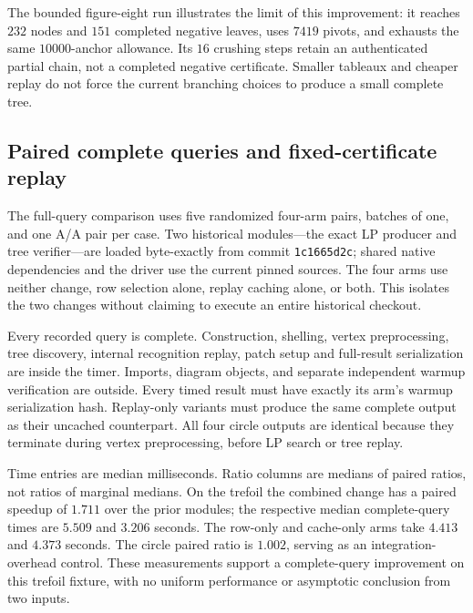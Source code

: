 The bounded figure-eight run illustrates the limit of this improvement:
it reaches $232$ nodes and $151$ completed negative leaves, uses $7419$
pivots, and exhausts the same $10000$-anchor allowance.  Its $16$ crushing
steps retain an authenticated partial chain, not a completed negative
certificate.  Smaller tableaux and cheaper replay do not force the current
branching choices to produce a small complete tree.

\subsection{Paired complete queries and fixed-certificate replay}

The full-query comparison uses five randomized four-arm pairs, batches of
one, and one A/A pair per case.  Two historical modules---the exact LP
producer and tree verifier---are loaded byte-exactly from commit
\texttt{1c1665d2c}; shared native dependencies and the driver use the current
pinned sources.  The four arms use neither change, row selection alone,
replay caching alone, or both.  This isolates the two changes without claiming
to execute an entire historical checkout.

Every recorded query is complete.  Construction, shelling, vertex
preprocessing, tree discovery, internal recognition replay, patch setup and
full-result serialization are inside the timer.  Imports, diagram objects,
and separate independent warmup verification are outside.  Every timed
result must have exactly its arm's warmup serialization hash.  Replay-only
variants must produce the same complete output as their uncached counterpart.
All four circle outputs are identical because they terminate during vertex
preprocessing, before LP search or tree replay.

\begin{center}
\small
\setlength{\tabcolsep}{3pt}

\end{center}

Time entries are median milliseconds.  Ratio columns are medians of paired
ratios, not ratios of marginal medians.  On the trefoil the combined change
has a paired speedup of $1.711$ over the prior modules; the respective median
complete-query times are $5.509$ and $3.206$ seconds.  The row-only and
cache-only arms take $4.413$ and $4.373$ seconds.  The circle paired ratio is
$1.002$, serving as an integration-overhead control.  These measurements
support a complete-query improvement on this trefoil fixture, with no
uniform performance or asymptotic conclusion from two inputs.


